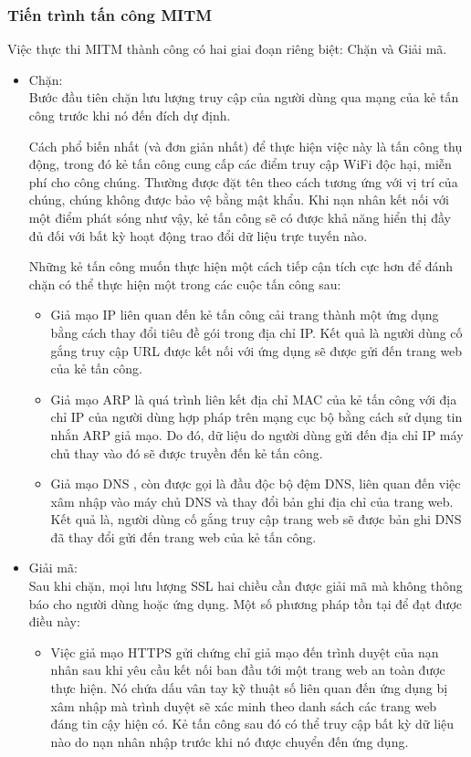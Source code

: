 \subsubsection{Tiến trình tấn công MITM}
Việc thực thi MITM thành công có hai giai đoạn riêng biệt: Chặn và Giải mã.
\begin{itemize}
    \item Chặn:\\
    Bước đầu tiên chặn lưu lượng truy cập của người dùng qua mạng của kẻ tấn công trước khi nó đến đích dự định.
    
Cách phổ biến nhất (và đơn giản nhất) để thực hiện việc này là tấn công thụ động, trong đó kẻ tấn công cung cấp các điểm truy cập WiFi độc hại, miễn phí cho công chúng. Thường được đặt tên theo cách tương ứng với vị trí của chúng, chúng không được bảo vệ bằng mật khẩu. Khi nạn nhân kết nối với một điểm phát sóng như vậy, kẻ tấn công sẽ có được khả năng hiển thị đầy đủ đối với bất kỳ hoạt động trao đổi dữ liệu trực tuyến nào.

Những kẻ tấn công muốn thực hiện một cách tiếp cận tích cực hơn để đánh chặn có thể thực hiện một trong các cuộc tấn công sau:
\begin{itemize}
    \item Giả mạo IP  liên quan đến kẻ tấn công cải trang thành một ứng dụng bằng cách thay đổi tiêu đề gói trong địa chỉ IP. Kết quả là người dùng cố gắng truy cập URL được kết nối với ứng dụng sẽ được gửi đến trang web của kẻ tấn công.
    \item Giả mạo ARP  là quá trình liên kết địa chỉ MAC của kẻ tấn công với địa chỉ IP của người dùng hợp pháp trên mạng cục bộ bằng cách sử dụng tin nhắn ARP giả mạo. Do đó, dữ liệu do người dùng gửi đến địa chỉ IP máy chủ thay vào đó sẽ được truyền đến kẻ tấn công.

\item Giả mạo DNS , còn được gọi là đầu độc bộ đệm DNS, liên quan đến việc xâm nhập vào máy chủ DNS và thay đổi bản ghi địa chỉ của trang web. Kết quả là, người dùng cố gắng truy cập trang web sẽ được bản ghi DNS đã thay đổi gửi đến trang web của kẻ tấn công.

\end{itemize}
\item Giải mã:\\
Sau khi chặn, mọi lưu lượng SSL hai chiều cần được giải mã mà không thông báo cho người dùng hoặc ứng dụng. Một số phương pháp tồn tại để đạt được điều này:
\begin{itemize}
    \item Việc giả mạo HTTPS  gửi chứng chỉ giả mạo đến trình duyệt của nạn nhân sau khi yêu cầu kết nối ban đầu tới một trang web an toàn được thực hiện. Nó chứa dấu vân tay kỹ thuật số liên quan đến ứng dụng bị xâm nhập mà trình duyệt sẽ xác minh theo danh sách các trang web đáng tin cậy hiện có. Kẻ tấn công sau đó có thể truy cập bất kỳ dữ liệu nào do nạn nhân nhập trước khi nó được chuyển đến ứng dụng.


\end{itemize}
\end{itemize}
